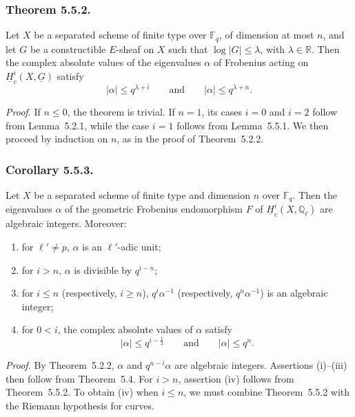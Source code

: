 \subsubsection*{Theorem 5.5.2.}
Let $X$ be a separated scheme of finite type over $\mathbb F_q$, of
dimension at most $n$, and let $G$ be a constructible $E$-sheaf
on $X$ such that $\log|G|\leq\lambda$, with
$\lambda\in\mathbb R$.  Then the complex absolute values of the eigenvalues
$\alpha$ of Frobenius acting on $\underline H_c^i(X,\underline G)$ satisfy
\[
|\alpha|\leq q^{\lambda+i}
\qquad\text{and}\qquad
|\alpha|\leq q^{\lambda+n}.
\]

\medskip
\noindent\emph{Proof.}
If $n\leq0$, the theorem is trivial.  If $n=1$, its cases $i=0$ and $i=2$
follow from Lemma~5.2.1, while the case $i=1$ follows from
Lemma~5.5.1.  We then proceed by induction on $n$, as in the proof of
Theorem~5.2.2.

\subsubsection*{Corollary 5.5.3.}
Let $X$ be a separated scheme of finite type and dimension $n$ over
$\mathbb F_q$.  Then the eigenvalues $\alpha$ of the geometric Frobenius
endomorphism $F$ of $\underline H_c^i(X,\mathbb Q_\ell)$ are algebraic
integers.  Moreover:
\begin{enumerate}[label=(\roman*)]
\item for $\ell'\ne p$, $\alpha$ is an $\ell'$-adic unit;
\item for $i>n$, $\alpha$ is divisible by $q^{i-n}$;
\item for $i\leq n$ (respectively, $i\geq n$),
  $q^i\alpha^{-1}$ (respectively, $q^n\alpha^{-1}$) is an algebraic integer;
\item for $0<i$, the complex absolute values of $\alpha$ satisfy
  \[
  |\alpha|\leq q^{i-\frac12}
  \qquad\text{and}\qquad
  |\alpha|\leq q^n.
  \]
\end{enumerate}

\medskip
\noindent\emph{Proof.}
By Theorem~5.2.2, $\alpha$ and $q^{n-i}\alpha$ are algebraic integers.
Assertions (i)--(iii) then follow from Theorem~5.4.  For $i>n$, assertion
(iv) follows from Theorem~5.5.2.  To obtain (iv) when $i\leq n$, we must
combine Theorem~5.5.2 with the Riemann hypothesis for curves.

